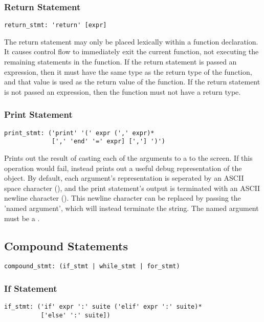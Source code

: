 \subsubsection{Return Statement}

\begin{lstlisting}
return_stmt: 'return' [expr]
\end{lstlisting}

The return statement may only be placed lexically within a function declaration.
It causes control flow to immediately exit the current function, not executing
the remaining statements in the function. If the return statement is passed an
expression, then it must have the same type as the return type of the function,
and that value is used as the return value of the function. If the return
statement is not passed an expression, then the function must not have a return
type.

\subsubsection{Print Statement}
\label{sec:print_stmt}

\begin{lstlisting}
print_stmt: ('print' '(' expr (',' expr)*
             [',' 'end' '=' expr] [','] ')')
\end{lstlisting}

Prints out the result of casting each of the arguments to a  to the
screen. If this operation would fail, instead prints out a useful debug
representation of the object. By default, each argument's representation is
seperated by an ASCII space character (), and the print statement's
output is terminated with an ASCII newline character (). This
newline character can be replaced by passing the  'named argument',
which will instead terminate the string. The  named argument must be a
.

\subsection{Compound Statements}

\begin{lstlisting}
compound_stmt: (if_stmt | while_stmt | for_stmt)
\end{lstlisting}

\subsubsection{If Statement}
\begin{lstlisting}
if_stmt: ('if' expr ':' suite ('elif' expr ':' suite)*
          ['else' ':' suite])
\end{lstlisting}

